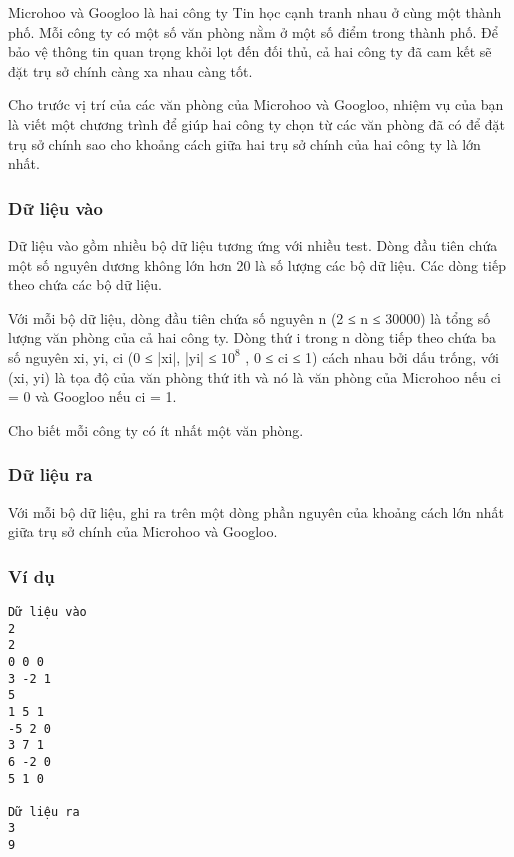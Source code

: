 



   Microhoo và Googloo là hai công ty Tin học cạnh tranh nhau ở cùng một thành phố. Mỗi công ty có một số văn phòng nằm ở một số điểm trong thành phố. Để bảo vệ thông tin quan trọng khỏi lọt đến đối thủ, cả hai công ty đã cam kết sẽ đặt trụ sở chính càng xa nhau càng tốt.  

   Cho trước vị trí của các văn phòng của Microhoo và Googloo, nhiệm vụ của bạn là viết một chương trình để giúp hai công ty chọn từ các văn phòng đã có để đặt trụ sở chính sao cho khoảng cách giữa hai trụ sở chính của hai công ty là lớn nhất.  

\subsubsection{   Dữ liệu vào  }

   Dữ liệu vào gồm nhiều bộ dữ liệu tương ứng với nhiều test. Dòng đầu tiên chứa một số nguyên dương không lớn hơn 20 là số lượng các bộ dữ liệu. Các dòng tiếp theo chứa các bộ dữ liệu.  

   Với mỗi bộ dữ liệu, dòng đầu tiên chứa số nguyên n (2 ≤ n ≤ 30000) là tổng số lượng văn phòng của cả hai công ty. Dòng thứ i trong n dòng tiếp theo chứa ba số nguyên xi, yi, ci (0 ≤ |xi|, |yi| ≤ $10^{8}$   , 0 ≤ ci ≤ 1) cách nhau bởi dấu trống, với (xi, yi) là tọa độ của văn phòng thứ ith và nó là văn phòng của Microhoo nếu ci = 0 và Googloo nếu ci = 1.  

   Cho biết mỗi công ty có ít nhất một văn phòng.  

\subsubsection{   Dữ liệu ra  }

   Với mỗi bộ dữ liệu, ghi ra trên một dòng phần nguyên của khoảng cách lớn nhất giữa trụ sở chính của Microhoo và Googloo.  

\subsubsection{   Ví dụ  }
\begin{verbatim}
Dữ liệu vào
2
2
0 0 0
3 -2 1
5
1 5 1 
-5 2 0
3 7 1
6 -2 0 
5 1 0

Dữ liệu ra
3
9
\end{verbatim}
